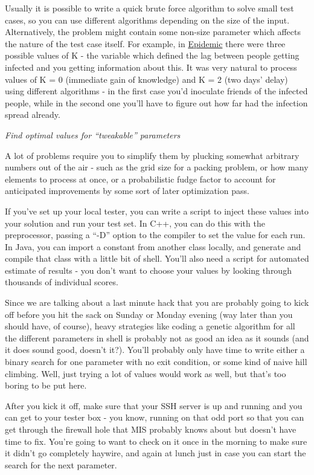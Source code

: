 \documentclass[]{article}
\begin{document}
Usually it is possible to write a quick brute force algorithm to solve
small test cases, so you can use different algorithms depending on the
size of the input. Alternatively, the problem might contain some
non-size parameter which affects the nature of the test case itself. For
example, in
\href{http://www.topcoder.com/longcontest/?module=ViewProblemStatement\&rd=11131\&pm=8632}{Epidemic}
there were three possible values of K - the variable which defined the
lag between people getting infected and you getting information about
this. It was very natural to process values of K = 0 (immediate gain of
knowledge) and K = 2 (two days' delay) using different algorithms - in
the first case you'd inoculate friends of the infected people, while in
the second one you'll have to figure out how far had the infection
spread already.

\emph{Find optimal values for ``tweakable'' parameters}

A lot of problems require you to simplify them by plucking somewhat
arbitrary numbers out of the air - such as the grid size for a packing
problem, or how many elements to process at once, or a probabilistic
fudge factor to account for anticipated improvements by some sort of
later optimization pass.

If you've set up your local tester, you can write a script to inject
these values into your solution and run your test set. In C++, you can
do this with the preprocessor, passing a ``-D'' option to the compiler
to set the value for each run. In Java, you can import a constant from
another class locally, and generate and compile that class with a little
bit of shell. You'll also need a script for automated estimate of
results - you don't want to choose your values by looking through
thousands of individual scores.

Since we are talking about a last minute hack that you are probably
going to kick off before you hit the sack on Sunday or Monday evening
(way later than you should have, of course), heavy strategies like
coding a genetic algorithm for all the different parameters in shell is
probably not as good an idea as it sounds (and it does sound good,
doesn't it?). You'll probably only have time to write either a binary
search for one parameter with no exit condition, or some kind of naive
hill climbing. Well, just trying a lot of values would work as well, but
that's too boring to be put here.

After you kick it off, make sure that your SSH server is up and running
and you can get to your tester box - you know, running on that odd port
so that you can get through the firewall hole that MIS probably knows
about but doesn't have time to fix. You're going to want to check on it
once in the morning to make sure it didn't go completely haywire, and
again at lunch just in case you can start the search for the next
parameter.
\end{document}
